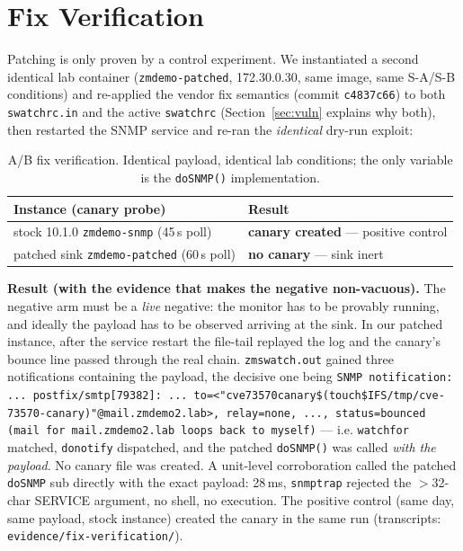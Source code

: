 
\section{Fix Verification}
\label{sec:fix}

Patching is only proven by a control experiment. We instantiated a second
identical lab container (\texttt{zmdemo-patched}, 172.30.0.30, same image,
same S-A/S-B conditions) and re-applied the vendor fix semantics
(commit \texttt{c4837c66}) to both \texttt{swatchrc.in} and the active
\texttt{swatchrc} (Section~\ref{sec:vuln} explains why both), then restarted
the SNMP service and re-ran the \emph{identical} dry-run exploit:

\begin{table}[t]
\centering
\footnotesize
\small
\begin{tabular}{@{}p{3.4cm}p{4.0cm}@{}}
\toprule
Instance (canary probe) & Result \\
\midrule
stock 10.1.0 \texttt{zmdemo-snmp} (45\,s poll) & \textbf{canary created} — positive control \\
patched sink \texttt{zmdemo-patched} (60\,s poll) & \textbf{no canary} — sink inert \\
\bottomrule
\end{tabular}
\caption{A/B fix verification. Identical payload, identical lab conditions;
the only variable is the \texttt{doSNMP()} implementation.}
\label{tab:fix}
\end{table}

\textbf{Result (with the evidence that makes the negative non-vacuous).}
The negative arm must be a \emph{live} negative: the monitor has to be
provably running, and ideally the payload has to be observed arriving at
the sink. In our patched instance, after the service restart the
file-tail replayed the log and the canary's bounce line passed through the
real chain. \texttt{zmswatch.out} gained three notifications containing the
payload, the decisive one being
\texttt{SNMP notification: ... postfix/smtp[79382]: ... to=<"cve73570canary\$(touch\${IFS}/\hspace{0pt}tmp/cve-73570-canary)"@\hspace{0pt}mail.zmdemo2.lab>,
relay=none, ..., status=bounced (mail for mail.zmdemo2.lab loops back to
myself)} — i.e. \texttt{watchfor} matched, \texttt{donotify} dispatched,
and the patched \texttt{doSNMP()} was called \emph{with the payload}.
No canary file was created. A unit-level corroboration called the patched
\texttt{doSNMP} sub directly with the exact payload: 28\,ms, \texttt{snmptrap}
rejected the $>$32-char SERVICE argument, no shell, no execution. The
positive control (same day, same payload, stock instance) created the canary
in the same run (transcripts: \texttt{evidence/fix-verification/}).

